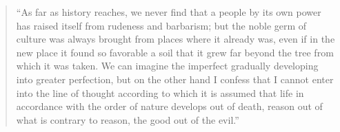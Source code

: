 \documentclass[12pt,a4paper,openany]{book}
\newcommand{\opage}[1]{\marginnote{\footnotesize\textit{[#1]}}}
\newenvironment{smallquote}{\begin{quote}}{\end{quote}}
\begin{document}
\begin{smallquote}

\setcounter{footnote}{0}%
\opage{78}``As far as history reaches, we never find that a people by its own power has
raised itself from rudeness and barbarism; but the noble germ of culture was always
brought from places where it already was, even if in the new place it found so
favorable a soil that it grew far beyond the tree from which it was taken. We can
imagine the imperfect gradually developing into greater perfection, but on the other
hand I confess that I cannot enter into the line of thought according to which it is
assumed that life in accordance with the order of nature develops out of death,
reason out of what is contrary to reason, the good out of the evil.''
\end{smallquote}
\end{document}
